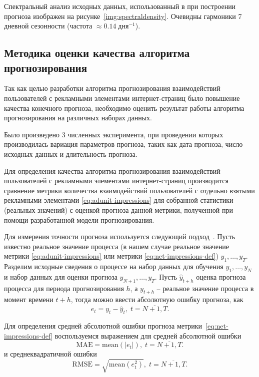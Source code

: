 Спектральный анализ исходных данных, использованный в при построении прогноза изображен на рисунке~\ref{img:spectraldensity}.
Очевидны гармоники 7 дневной сезонности (частота $\approx 0.14\;\text{дня}^{-1}$). 


\subsection{Методика оценки качества алгоритма прогнозирования}
Так как целью разработки алгоритма прогнозирования взаимодействий пользователей с рекламными элементами интернет-страниц
было повышение качества конечного прогноза, необходимо оценить результат работы алгоритма прогнозирования
на различных наборах данных.

Было произведено 3 численных эксперимента, при проведении которых производилась вариация параметров прогноза, таких как
дата прогноза, число исходных данных и длительность прогноза.

Для определения качества алгоритма прогнозирования взаимодействий пользователей с рекламными элементами интернет-страниц
производится сравнение метрики количества взаимодействий пользователей с отдельно взятыми рекламными 
элементами \eqref{eq:adunit-impressions} для собранной статистики (реальных значений) с оценкой прогноза данной метрики,
полученной при помощи разработанной модели прогнозирования.

Для измерения точности прогноза используется следующий подход~\autocite{eval:metrics}. Пусть известно реальное значение процесса (в нашем случае
реальное значение метрики \eqref{eq:adunit-impressions} или метрики \eqref{eq:net-impressions-def}) $y_1, \dots, y_T$.
Разделим исходные сведения о процессе на набор данных для обучения $y_1, \dots, y_N$ и набор данных для оценки прогноза 
$y_{N+1}, \dots, y_T$. Пусть $\hat{y}_{t+h}$ оценка прогноза процесса для периода прогнозирования $h$, а $y_{t+h}$ -- реальное
значение процесса в момент времени $t+h$, тогда можно ввести абсолютную ошибку прогноза, как 
\begin{equation}
    e_t = y_t - \hat{y}_t,\; t = \overline{N+1, T}.
\end{equation}

Для определения средней абсолютной ошибки прогноза метрики~\eqref{eq:net-impressions-def} воспользуемся выражением для
средней абсолютной ошибки
\begin{equation}
    \text{MAE} = \text{mean}\left( \left| e_t \right| \right),\; t = \overline{N+1, T}.
\end{equation}
и среднеквадратичной ошибки
\begin{equation}
    \text{RMSE} = \sqrt{\text{mean}\left( e_t^2 \right)},\; t = \overline{N+1, T}.
\end{equation}


